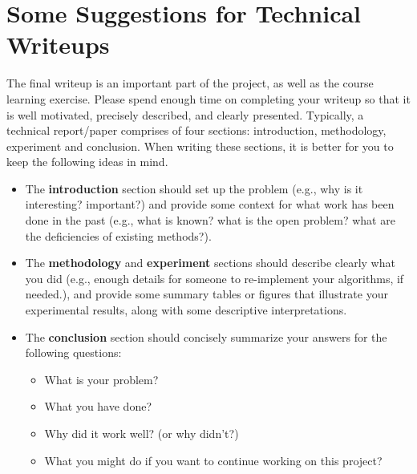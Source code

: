 \documentclass[10pt]{article}
\begin{document}
\appendix
\section{Some Suggestions for Technical Writeups}
The final writeup is an important part of the project, as well as the course learning exercise.
Please spend enough time on completing your writeup
so that it is well motivated, precisely described, and clearly presented.
Typically, a technical report/paper comprises of four sections: introduction, methodology, experiment and conclusion.
When writing these sections, it is better for you to keep the following ideas in mind.
\begin{itemize}
	\item The \textbf{introduction} section should set up the problem (e.g., why is it interesting? important?) and provide some
	      context for what work has been done in the past (e.g., what is known? what is the open problem? what are the deficiencies of
	      existing methods?).
	\item The \textbf{methodology} and \textbf{experiment} sections should describe clearly what you did (e.g., enough details for someone to
	      re-implement your algorithms, if needed.), and provide some summary tables or figures that illustrate your experimental results,
	      along with some descriptive interpretations.
	\item The \textbf{conclusion} section should concisely summarize your answers for the following questions:
	      \begin{itemize}
		      \item What is your problem?
		      \item What you have done?
		      \item Why did it work well? (or why didn't?)
		      \item What you might do if you want to continue working on this project?
	      \end{itemize}
\end{itemize}
\end{document}
